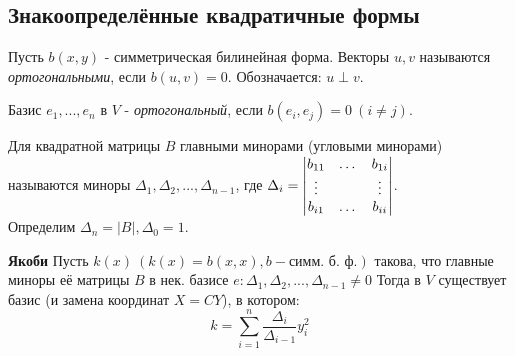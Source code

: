 \subsection{Знакоопределённые квадратичные формы}
\begin{definition}
    Пусть $b(x, y)$ - симметрическая билинейная форма. Векторы $u, v$ называются \textit{ортогональными}, если $b(u, v) = 0$. Обозначается: $u \perp v$.
\end{definition}
\begin{definition} 
    Базис $e_1,...,e_n$ в $V$ - \textit{ортогональный}, если $b(e_i, e_j) = 0 \ (i \neq j)$.
\end{definition}
\begin{definition}
    Для квадратной матрицы $B$ главными минорами (угловыми минорами) называются миноры $\Delta_1,\Delta_2,...,\Delta_{n-1}$, где $\Delta_i = \begin{vmatrix} b_{11}&\dots&b_{1i}\\\vdots&\null&\vdots\\b_{i1}&\dots&b_{ii}\end{vmatrix}$. \\
    Определим $\Delta_n = |B|, \Delta_0 = 1$.
\end{definition}
\begin{theorem} \textbf{Якоби}
    Пусть $k(x) \ (k(x)=b(x, x), b - \text{симм. б. ф.})$ такова, что главные миноры её матрицы $B$ в нек. базисе $e: \Delta_1,\Delta_2,...,\Delta_{n-1} \neq 0$
    Тогда в $V$ существует базис (и замена координат $X = CY$), в котором:
    $$k = \sum \limits_{i=1}^{n} \frac{\Delta_i}{\Delta_{i-1}}y_i^2$$
\end{theorem}

